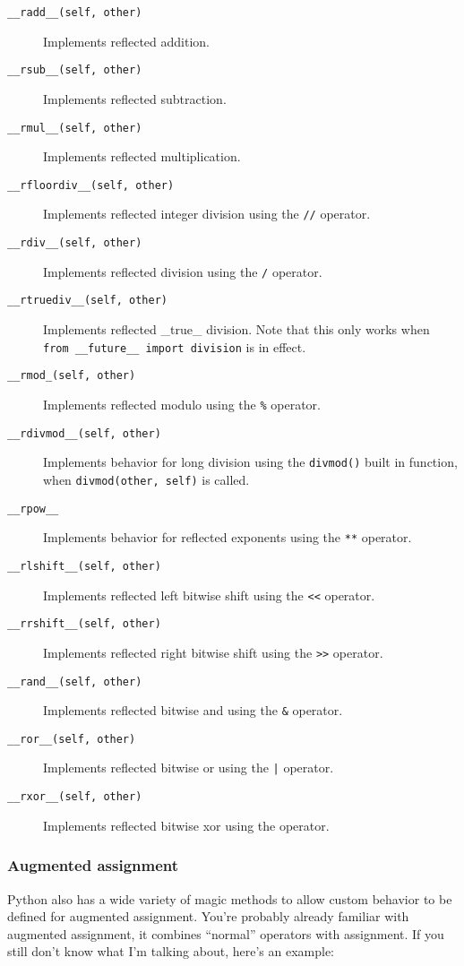 \documentclass[a4paper,11pt]{article}
\newcommand{\code}[1]{\texttt{#1}}
\begin{document}
\begin{description}

\item[\code{__radd__(self, other)}]
Implements reflected addition.
\item[\code{__rsub__(self, other)}]
Implements reflected subtraction.
\item[\code{__rmul__(self, other)}]
Implements reflected multiplication.
\item[\code{__rfloordiv__(self, other)}]
Implements reflected integer division using the \code{//} operator.
\item[\code{__rdiv__(self, other)}]
Implements reflected division using the \code{/} operator.
\item[\code{__rtruediv__(self, other)}]
Implements reflected _true_ division. Note that this only works when \code{from __future__ import division} is in effect.
\item[\code{__rmod_(self, other)}]
Implements reflected modulo using the \code{\%} operator.
\item[\code{__rdivmod__(self, other)}]
Implements behavior for long division using the \code{divmod()} built in function, when \code{divmod(other, self)} is called.
\item[\code{__rpow__}]
Implements behavior for reflected exponents using the \code{**} operator.
\item[\code{__rlshift__(self, other)}]
Implements reflected left bitwise shift using the \code{<<} operator.
\item[\code{__rrshift__(self, other)}]
Implements reflected right bitwise shift using the \code{>>} operator.
\item[\code{__rand__(self, other)}]
Implements reflected bitwise and using the \code{\&} operator.
\item[\code{__ror__(self, other)}]
Implements reflected bitwise or using the \code{|} operator.
\item[\code{__rxor__(self, other)}]
Implements reflected bitwise xor using the \code{} operator.

\end{description}

\subsubsection{Augmented assignment}

Python also has a wide variety of magic methods to allow custom behavior to be defined for augmented assignment. You're probably already familiar with augmented assignment, it combines ``normal'' operators with assignment. If you still don't know what I'm talking about, here's an example:
\end{document}
